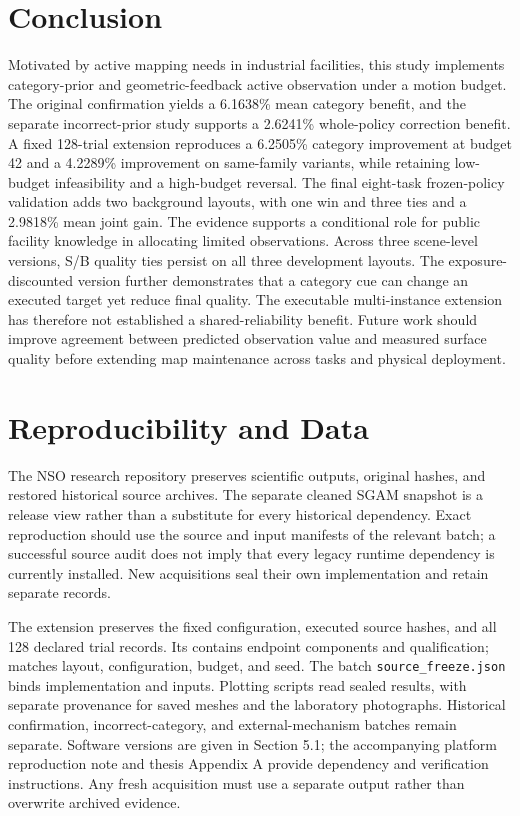 \documentclass[11pt,a4paper]{article}
\begin{document}
\hypertarget{conclusion}{%
\section{Conclusion}\label{conclusion}}

Motivated by active mapping needs in industrial facilities, this study implements category-prior and geometric-feedback active observation under a motion budget. The original confirmation yields a 6.1638\% mean category benefit, and the separate incorrect-prior study supports a 2.6241\% whole-policy correction benefit. A fixed 128-trial extension reproduces a 6.2505\% category improvement at budget 42 and a 4.2289\% improvement on same-family variants, while retaining low-budget infeasibility and a high-budget reversal. The final eight-task frozen-policy validation adds two background layouts, with one win and three ties and a 2.9818\% mean joint gain. The evidence supports a conditional role for public facility knowledge in allocating limited observations. Across three scene-level versions, S/B quality ties persist on all three development layouts. The exposure-discounted version further demonstrates that a category cue can change an executed target yet reduce final quality. The executable multi-instance extension has therefore not established a shared-reliability benefit. Future work should improve agreement between predicted observation value and measured surface quality before extending map maintenance across tasks and physical deployment.

\hypertarget{reproducibility-and-data}{%
\section*{Reproducibility and Data}\label{reproducibility-and-data}}

The NSO research repository preserves scientific outputs, original hashes, and restored historical source archives. The separate cleaned SGAM snapshot is a release view rather than a substitute for every historical dependency. Exact reproduction should use the source and input manifests of the relevant batch; a successful source audit does not imply that every legacy runtime dependency is currently installed. New acquisitions seal their own implementation and retain separate records.

The extension preserves the fixed configuration, executed source hashes, and all 128 declared trial records. Its  contains endpoint components and qualification;  matches layout, configuration, budget, and seed. The batch \texttt{source\_freeze.json} binds implementation and inputs. Plotting scripts read sealed results, with separate provenance for saved meshes and the laboratory photographs. Historical confirmation, incorrect-category, and external-mechanism batches remain separate. Software versions are given in Section 5.1; the accompanying platform reproduction note and thesis Appendix A provide dependency and verification instructions. Any fresh acquisition must use a separate output rather than overwrite archived evidence.
\end{document}
